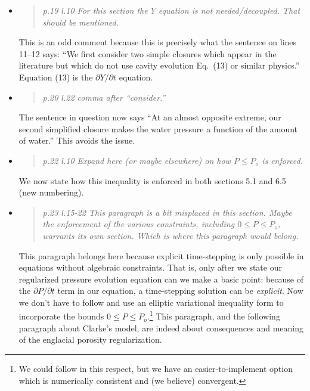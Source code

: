 \documentclass[11pt,reqno]{amsart}
\newcommand{\reply}[2]{
\medskip\medskip
\item  \begin{quote}
\emph{#1}
\end{quote}

\medskip
\noindent #2}
\begin{document}
\begin{itemize}
\reply{p.19 l.10 For this section the $Y$ equation is not needed/decoupled. That should be
mentioned.}
{This is an odd comment because this is precisely what the sentence on lines 11--12 says: ``We first consider two simple closures which appear in the literature but which do not use cavity evolution Eq.~(13) or similar physics.''  Equation (13) is the $\partial Y/\partial t$ equation.}

\reply{p.20 l.22 comma after ``consider.''}
{The sentence in question now says ``At an almost opposite extreme, our second simplified closure makes the water pressure a function of the amount of water.''  This avoids the issue.}

\reply{p.22 l.10 Expand here (or maybe elsewhere) on how $P \le P_o$ is enforced.}
{We now state how this inequality is enforced in both sections 5.1 and 6.5 (new numbering).}

\reply{p.23 l.15-22 This paragraph is a bit misplaced in this section.  Maybe the enforcement of the various constraints, including $0 \le P \le P_o$, warrants its own section.  Which is where this paragraph would belong.}
{This paragraph belongs here because explicit time-stepping is only possible in equations without algebraic constraints.  That is, only after we state our regularized pressure evolution equation can we make a basic point: because of the $\partial P/\partial t$ term in our equation, a time-stepping solution can be \emph{explicit}.  Now we don't have to follow \cite{Schoofetal2012} and use an elliptic variational inequality form to incorporate the bounds $0\le P \le P_o$.\footnote{We could follow \cite{Schoofetal2012} in this respect, but we have an easier-to-implement option which is numerically consistent and (we believe) convergent.}  This paragraph, and the following paragraph about Clarke's model, are indeed about consequences and meaning of the englacial porosity regularization.}


\end{itemize}
\end{document}
